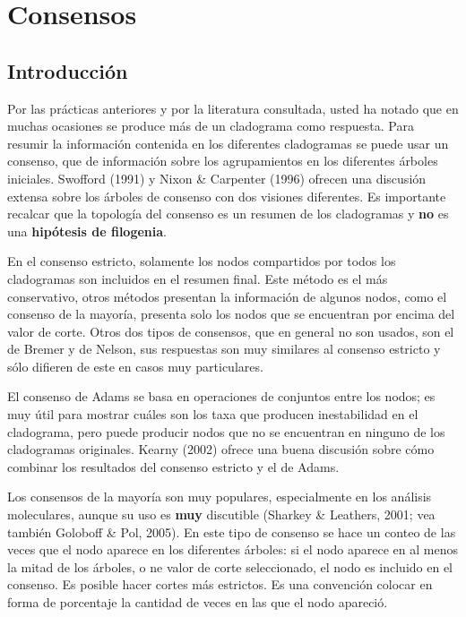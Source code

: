 \chapter{Consensos}
\section*{Introducci\'on}
Por las pr\'acticas anteriores y por la literatura consultada, usted ha notado que en muchas ocasiones se produce m\'as de un cladograma como respuesta. Para resumir la informaci\'on contenida en los diferentes cladogramas se puede usar un consenso, que de informaci\'on sobre los agrupamientos en los diferentes \'arboles iniciales. Swofford (1991) y Nixon \& Carpenter (1996) ofrecen una discusi\'on extensa sobre los \'arboles de consenso con dos visiones diferentes. Es importante recalcar que la topolog\'ia del consenso es un resumen de los cladogramas y \textbf{no} es una \textbf{hip\'otesis de filogenia}.


En el consenso estricto, solamente los nodos compartidos por todos los cladogramas son incluidos en el resumen final. Este m\'etodo es el m\'as conservativo, otros m\'etodos presentan la informaci\'on de algunos nodos, como el consenso de la mayor\'ia, presenta solo los nodos que se encuentran por encima del valor de corte. Otros dos tipos de consensos, que en general no son usados, son el de Bremer y de Nelson, sus respuestas son muy similares al consenso estricto y s\'olo difieren de este en casos muy particulares.


El consenso de Adams se basa en operaciones de conjuntos entre los nodos; es muy \'util para mostrar cu\'ales son los taxa que producen inestabilidad en el cladograma, pero puede producir nodos que no se encuentran en ninguno de los cladogramas originales. Kearny (2002) ofrece una buena discusi\'on sobre c\'omo combinar los resultados del consenso estricto y el de Adams.

Los consensos de la mayor\'ia son muy populares, especialmente en los an\'alisis moleculares, aunque su uso es \textbf{muy} discutible (Sharkey \& Leathers, 2001; vea tambi\'en Goloboff \& Pol, 2005). En este tipo de consenso se hace un conteo de las veces que el nodo aparece en los diferentes \'arboles: si el nodo aparece en al menos la mitad de los \'arboles, o ne valor de corte seleccionado, el nodo es incluido en el consenso. Es posible hacer cortes m\'as estrictos. Es una convenci\'on colocar en forma de porcentaje la cantidad de veces en las que el nodo apareci\'o.



